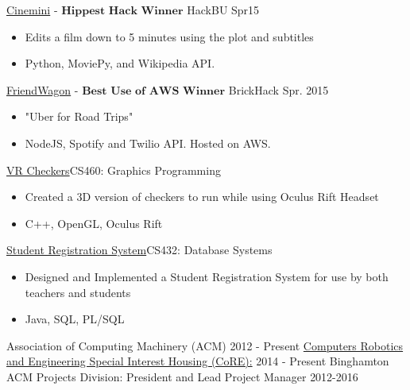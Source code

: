\documentclass[11pt]{article}
\begin{document}
\projects
{{\href{https://github.com/gabeochoa/Cinemini}{Cinemini}} - $\textbf{Hippest Hack Winner}$ }{HackBU Spr15}
{
    \begin{itemize}[label={}]
    	\setlength\itemsep{.005ex}
        \item{Edits a film down to 5 minutes using the plot and subtitles}
        \item{Python, MoviePy, and Wikipedia API.}
    \end{itemize}
}

\headedsubsection
{{\href{https://github.com/alanplotko/RoadTrip}{FriendWagon}} - $\textbf{Best Use of AWS Winner}$ }
{BrickHack Spr. 2015}
{
    \begin{itemize}[label={}]
    	\setlength\itemsep{.005ex}
        \item{"Uber for Road Trips"}
        \item{NodeJS, Spotify and Twilio API. Hosted on AWS.}
    \end{itemize}
}

\headedsubsection
{\href{}{VR Checkers}}{CS460: Graphics Programming}
{
    \begin{itemize}[label={}]
    	\setlength\itemsep{.005ex}
        \item{Created a 3D version of checkers to run while using Oculus Rift Headset}
        \item{C++, OpenGL, Oculus Rift}
    \end{itemize}
}
\headedsubsection
{\href{}{Student Registration System}}{CS432: Database Systems}
{
    \begin{itemize}[label={}]
    	\setlength\itemsep{.005ex}
        \item{Designed and Implemented a Student Registration System for use by both teachers and students}
        \item{Java, SQL, PL/SQL}
    \end{itemize}
}
\spacedhrule{0.1em}{0.3em}  %

\inlineheadrightdate
{Association of Computing Machinery (ACM)}
{2012 - Present}
\inlineheadrightdate
{\href{http://core.binghamton.edu/}{Computers Robotics and Engineering Special Interest Housing (CoRE):}}
{2014 - Present}
\inlineheadrightdate
{Binghamton ACM Projects Division: President and Lead Project Manager}
{2012-2016}
\end{document}
